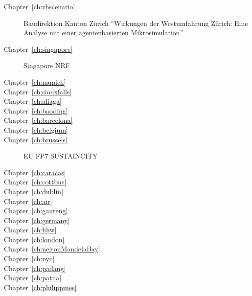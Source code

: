 \begin{description}
\item[Chapter~\ref{ch:zhscenario}]  Baudirektion Kanton Zürich ``Wirkungen der Westumfahrung Zürich: Eine Analyse mit einer agentenbasierten Mikrosimulation''

\item[Chapter~\ref{ch:singapore}]  Singapore NRF 

\item[Chapter~\ref{ch:munich}]  

\item[Chapter~\ref{ch:siouxfalls}]  

\item[Chapter~\ref{ch:aliaga}]  

\item[Chapter~\ref{ch:baoding}]  

\item[Chapter~\ref{ch:barcelona}]  

\item[Chapter~\ref{ch:belgium}]  

\item[Chapter~\ref{ch:brussels}]  EU FP7 SUSTAINCITY 

\item[Chapter~\ref{ch:caracas}]  

\item[Chapter~\ref{ch:cottbus}]  

\item[Chapter~\ref{ch:dublin}]  

\item[Chapter~\ref{ch:air}]  

\item[Chapter~\ref{ch:gauteng}]  

\item[Chapter~\ref{ch:germany}]  

\item[Chapter~\ref{ch:hhw}]  

\item[Chapter~\ref{ch:london}]  

\item[Chapter~\ref{ch:nelsonMandelaBay}]  

\item[Chapter~\ref{ch:nyc}]  

\item[Chapter~\ref{ch:padang}]  

\item[Chapter~\ref{ch:patna}]  

\item[Chapter~\ref{ch:philippines}]  


\end{description}
